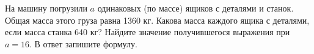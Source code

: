 \begin{ex}
	\begin{condition}
		На машину погрузили \( a \) одинаковых (по массе) ящиков с деталями и станок. Общая масса
		этого груза равна 1360 кг. Какова масса каждого ящика с деталями, если масса станка 640 кг?
		Найдите значение получившегося выражения при \( a=16 \). В ответ запишите формулу.
	\end{condition}
\end{ex}